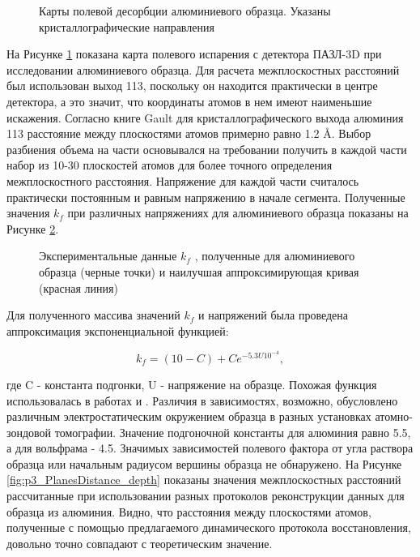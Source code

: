 \begin{figure}[htb]
	\caption{Карты полевой десорбции алюминиевого образца. Указаны кристаллографические направления \cite{scbibDensity}}
	\label{fig:p3_Alion}
\end{figure} 

На Рисунке \cref{fig:p3_Alion} показана карта полевого испарения с детектора ПАЗЛ-3D при исследовании алюминиевого образца. Для расчета межплоскостных расстояний был использован выход {113}, поскольку он находится практически в центре детектора, а это значит, что координаты атомов в нем имеют наименьшие искажения. Согласно книге Gault для кристаллографического выхода алюминия {113} расстояние между плоскостями атомов примерно равно 1.2 \r{A}. Выбор разбиения объема на части основывался на требовании получить в каждой части набор из 10-30 плоскостей атомов для более точного определения межплоскостного расстояния. Напряжение для каждой части считалось практически постоянным и равным напряжению в начале сегмента. Полученные значения $k_f$ при различных напряжениях для алюминиевого образца показаны на Рисунке \cref{fig:p3_kf_vs_voltage}. 

\begin{figure}[htb]
	\caption{Экспериментальные данные $k_f$ \cite{scbibDensity}, полученные для алюминиевого образца (черные точки) и наилучшая аппроксимирующая кривая (красная линия)}
	\label{fig:p3_kf_vs_voltage}
\end{figure} 

Для полученного массива значений $k_f$ и напряжений была проведена аппроксимация экспоненциальной функцией:

\begin{equation}
	\label{eq:equation3_n}
	k_f = (10 - C) + Ce^{-5.3 U 10^{-4}},
\end{equation} 

где C - константа подгонки, U - напряжение на образце. Похожая функция использовалась в работах \cite{Hatzoglou19} и \cite{Loi13}. Различия в зависимостях, возможно, обусловлено различным электростатическим окружением образца в разных установках атомно-зондовой томографии. Значение подгоночной константы для алюминия равно 5.5, а для вольфрама - 4.5. Значимых зависимостей полевого фактора от угла раствора образца или начальным радиусом вершины образца не обнаружено. На Рисунке \cref{fig:p3_PlanesDistance_depth} показаны значения межплоскостных расстояний рассчитанные при использовании разных протоколов реконструкции данных для образца из алюминия. Видно, что  расстояния между плоскостями атомов,  полученные с помощью предлагаемого динамического протокола восстановления, довольно точно совпадают с теоретическим значение.

